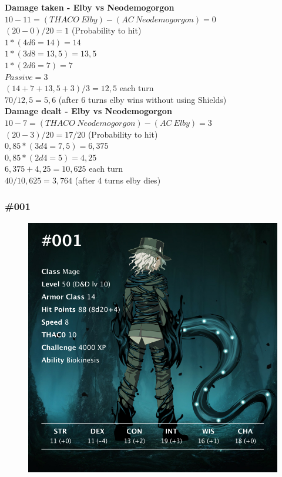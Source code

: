 \vspace*{4mm}
\textbf{Damage taken - Elby vs Neodemogorgon}\\
\newline
$10-11 = (THACO\:Elby)-(AC\:Neodemogorgon) = 0$\\
$(20-0)/20 = 1$ (Probability to hit)\\
$1*(4d6=14) = 14$\\
$1*(3d8=13,5) = 13,5$\\
$1*(2d6=7) = 7$\\
$Passive = 3$\\
$(14+7+13,5+3)/3 = 12,5$ each turn\\
$70/12,5 = 5,6$ (after 6 turns elby wins without using Shields)\\

\textbf{Damage dealt - Elby vs Neodemogorgon}\\
\newline
$10-7 = (THACO\:Neodemogorgon)-(AC\:Elby) = 3$\\
$(20-3)/20 = 17/20$ (Probability to hit)\\
$0,85*(3d4=7,5) = 6,375$\\
$0,85*(2d4=5) = 4,25$\\
$6,375+4,25 = 10,625$ each turn\\
$40/10,625 = 3,764$ (after 4 turns elby dies)\\

\newpage


\subsubsection{\#001}
\vspace*{0.3cm}
\begin{figure}[H]
	\centering
	\includegraphics[width=0.9\linewidth]{images/visual_stats/001.png}
\end{figure}
\vspace*{4mm}

